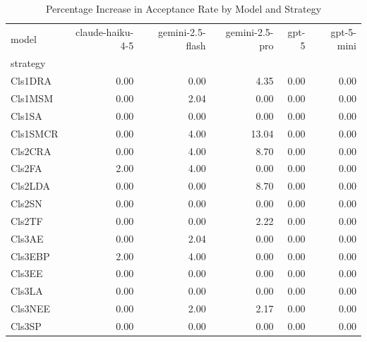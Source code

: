 \begin{table}
\caption{Percentage Increase in Acceptance Rate by Model and Strategy}
\label{tab:pct_increase}
\begin{tabular}{lrrrrr}
\toprule
model & claude-haiku-4-5 & gemini-2.5-flash & gemini-2.5-pro & gpt-5 & gpt-5-mini \\
strategy &  &  &  &  &  \\
\midrule
Cls1DRA & 0.00 & 0.00 & 4.35 & 0.00 & 0.00 \\
Cls1MSM & 0.00 & 2.04 & 0.00 & 0.00 & 0.00 \\
Cls1SA & 0.00 & 0.00 & 0.00 & 0.00 & 0.00 \\
Cls1SMCR & 0.00 & 4.00 & 13.04 & 0.00 & 0.00 \\
Cls2CRA & 0.00 & 4.00 & 8.70 & 0.00 & 0.00 \\
Cls2FA & 2.00 & 4.00 & 0.00 & 0.00 & 0.00 \\
Cls2LDA & 0.00 & 0.00 & 8.70 & 0.00 & 0.00 \\
Cls2SN & 0.00 & 0.00 & 0.00 & 0.00 & 0.00 \\
Cls2TF & 0.00 & 0.00 & 2.22 & 0.00 & 0.00 \\
Cls3AE & 0.00 & 2.04 & 0.00 & 0.00 & 0.00 \\
Cls3EBP & 2.00 & 4.00 & 0.00 & 0.00 & 0.00 \\
Cls3EE & 0.00 & 0.00 & 0.00 & 0.00 & 0.00 \\
Cls3LA & 0.00 & 0.00 & 0.00 & 0.00 & 0.00 \\
Cls3NEE & 0.00 & 2.00 & 2.17 & 0.00 & 0.00 \\
Cls3SP & 0.00 & 0.00 & 0.00 & 0.00 & 0.00 \\
\bottomrule
\end{tabular}
\end{table}
